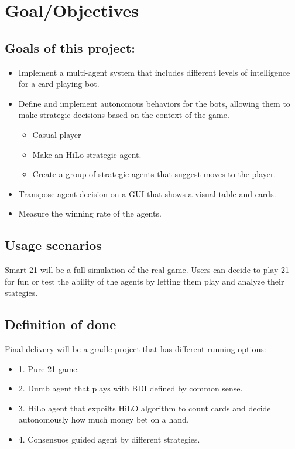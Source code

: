 \chapter{Goal/Objectives}
\label{ch:goal} %
\section{Goals of this project:}
\begin{itemize}
    \item Implement a multi-agent system that includes different levels of intelligence for a card-playing bot.
    \item Define and implement autonomous behaviors for the bots, allowing them to make strategic decisions based on the context of the game.
    \begin{itemize}
        \item Casual player
        \item Make an HiLo strategic agent.
        \item Create a group of strategic agents that suggest moves to the player.
    \end{itemize}
    \item Transpose agent decision on a GUI that shows a visual table and cards.
    \item Measure the winning rate of the agents.
\end{itemize}

\section{Usage scenarios}

Smart 21 will be a full simulation of the real game. Users can decide to play 21 for fun or test the ability of the agents by letting them play and analyze their stategies.  

\section{Definition of done}

Final delivery will be a gradle project that has different running options:

\begin{itemize}
    \item 1. Pure 21 game.
    \item 2. Dumb agent that plays with BDI defined by common sense.
    \item 3. HiLo agent that expoilts HiLO algorithm to count cards and decide autonomously how much money bet on a hand.
    \item 4. Consensuos guided agent by different strategies.
\end{itemize}

